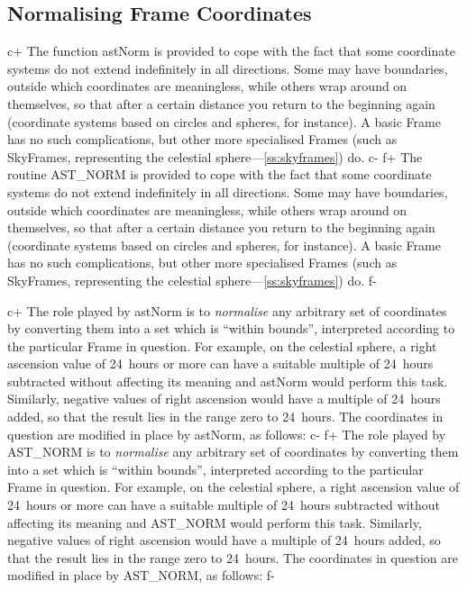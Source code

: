 \documentclass[twoside,11pt]{article}
\newcommand{\secref}[1]{\S\ref{#1}}
\renewcommand{\secref}[1]{\ref{#1}}
\begin{document}
\subsection{\label{ss:normalising}Normalising Frame Coordinates}

c+
The function astNorm is provided to cope with the fact that some
coordinate systems do not extend indefinitely in all directions. Some
may have boundaries, outside which coordinates are meaningless, while
others wrap around on themselves, so that after a certain distance you
return to the beginning again (coordinate systems based on circles and
spheres, for instance). A basic Frame has no such complications, but
other more specialised Frames (such as SkyFrames, representing the
celestial sphere---\secref{ss:skyframes}) do.
c-
f+
The routine AST\_NORM is provided to cope with the fact that some
coordinate systems do not extend indefinitely in all directions. Some
may have boundaries, outside which coordinates are meaningless, while
others wrap around on themselves, so that after a certain distance you
return to the beginning again (coordinate systems based on circles and
spheres, for instance). A basic Frame has no such complications, but
other more specialised Frames (such as SkyFrames, representing the
celestial sphere---\secref{ss:skyframes}) do.
f-

c+
The role played by astNorm is to {\em{normalise}} any arbitrary set of
coordinates by converting them into a set which is ``within bounds'',
interpreted according to the particular Frame in question. For
example, on the celestial sphere, a right ascension value of 24~hours
or more can have a suitable multiple of 24~hours subtracted without
affecting its meaning and astNorm would perform this task. Similarly,
negative values of right ascension would have a multiple of 24~hours
added, so that the result lies in the range zero to 24~hours. The
coordinates in question are modified in place by astNorm, as follows:
c-
f+
The role played by AST\_NORM is to {\em{normalise}} any arbitrary set
of coordinates by converting them into a set which is ``within
bounds'', interpreted according to the particular Frame in
question. For example, on the celestial sphere, a right ascension
value of 24~hours or more can have a suitable multiple of 24~hours
subtracted without affecting its meaning and AST\_NORM would perform
this task. Similarly, negative values of right ascension would have a
multiple of 24~hours added, so that the result lies in the range zero
to 24~hours. The coordinates in question are modified in place by
AST\_NORM, as follows:
f-
\end{document}
